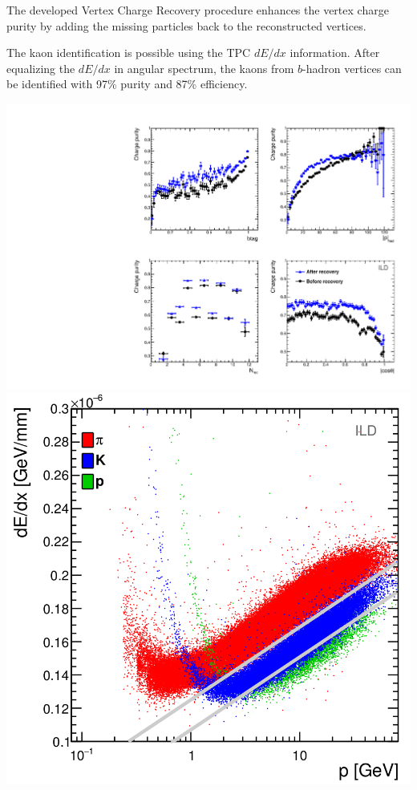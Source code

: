 \color{DarkSlateGray}
The developed Vertex Charge Recovery procedure enhances the vertex charge purity by adding the missing particles back to the reconstructed vertices. 


The kaon identification is possible using the TPC $dE/dx$ information. After equalizing the $dE/dx$ in angular spectrum, the kaons from $b$-hadron vertices can be identified with 97\% purity and 87\% efficiency.
\begin{center}\vspace{0.5cm}
	
	\includegraphics[clip, trim=10cm 0cm 0cm 10cm,width=0.45\linewidth]{plots/purity-recovery-ild.pdf}\label{fig:Charges_a_3}
	\includegraphics[width=0.41\linewidth]{plots/dedx2.png}\label{fig:Charges_b_3}
	\label{fig:Charges_3}
\end{center}\vspace{1cm}



